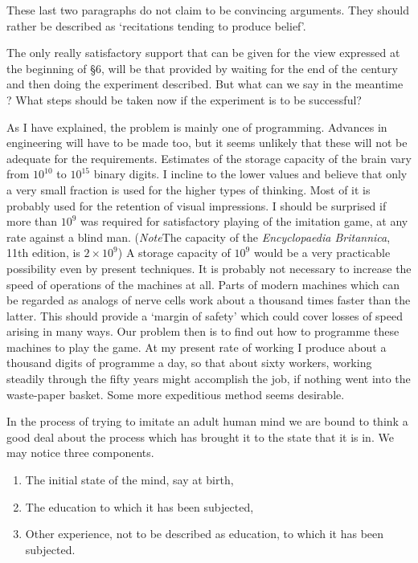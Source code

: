 \documentclass[10pt]{article} %
\begin{document}
These last two paragraphs do not claim to be convincing arguments. They should rather be described as `recitations tending to produce belief'.

The only really satisfactory support that can be given for the view expressed at the beginning of \S 6, will be that provided by waiting for the end of the century and then doing the experiment described. But what can we say in the meantime ? What steps should be taken now if the experiment is to be successful?

As I have explained, the problem is mainly one of programming. Advances in engineering will have to be made too, but it seems unlikely that these will not be adequate for the requirements. Estimates of the storage capacity of the brain vary from $10^{10}$ to $10^{15}$ binary digits. I incline to the lower values and believe that only a very small fraction is used for the higher types of thinking. Most of it is probably used for the retention of visual impressions. I should be surprised if more than $10^9$ was required for satisfactory playing of the imitation game, at any rate against a blind man. (\textit{Note}\textemdash The capacity of the \textit{Encyclopaedia Britannica}, 11th edition, is $2 \times 10^9$) A storage capacity of $10^9$ would be a very practicable possibility even by present techniques. It is probably not necessary to increase the speed of operations of the machines at all. Parts of modern machines which can be regarded as analogs of nerve cells work about a thousand times faster than the latter. This should provide a `margin of safety' which could cover losses of speed arising in many ways. Our problem then is to find out how to programme these machines to play the game. At my present rate of working I produce about a thousand digits of programme a day, so that about sixty workers, working steadily through the fifty years might accomplish the job, if nothing went into the waste-paper basket. Some more expeditious method seems desirable.

In the process of trying to imitate an adult human mind we are bound to think a good deal about the process which has brought it to the state that it is in. We may notice three components.
\begin{enumerate}[label=(\alph*),itemsep=0pt] %
    \item The initial state of the mind, say at birth,
    \item The education to which it has been subjected,
    \item Other experience, not to be described as education, to which it has been subjected.
\end{enumerate}
\end{document}
